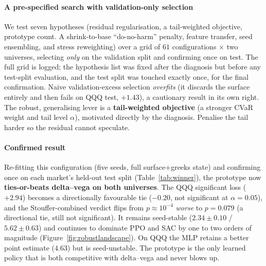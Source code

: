 \documentclass[sigconf,anonymous]{acmart}
\begin{document}
\paragraph{A pre-specified search with validation-only selection} We test seven
hypotheses (residual regularisation, a tail-weighted objective, prototype count.
A shrink-to-base ``do-no-harm'' penalty, feature transfer, seed ensembling, and
stress reweighting) over a grid of $61$ configurations $\times$ two universes,
selecting \emph{only} on the validation split and confirming once on test. The full
grid is logged; the hypothesis list was fixed after the diagnosis but before any
test-split evaluation, and the test split was touched exactly once, for the final
confirmation. Naive validation-excess selection \emph{overfits} (it discards the
surface entirely and then fails on QQQ test, $+1.43$), a cautionary result in its own
right. The robust, generalising lever is a \textbf{tail-weighted objective} (a stronger
CVaR weight and tail level $\alpha$), motivated directly by the diagnosis. Penalise the
tail harder so the residual cannot speculate.

\paragraph{Confirmed result} Re-fitting this configuration (five seeds, full
surface+greeks state) and confirming once on each market's held-out test split
(Table~\ref{tab:winner}), the prototype now \textbf{ties-or-beats delta--vega on both
universes}. The QQQ significant loss ($+2.94$) becomes a directionally favourable tie
($-0.20$, not significant at $\alpha=0.05$), and the Stouffer-combined verdict flips
from $p\approx10^{-4}$ \emph{worse} to $p=0.079$ (a directional tie, still not
significant). It remains seed-stable ($2.34\pm0.10$ / $5.62\pm0.63$) and continues
to dominate PPO and SAC by one to two orders of magnitude
(Figure~\ref{fig:robustlandscape}). On QQQ the MLP retains a better point estimate
($4.63$) but is seed-unstable. The prototype is the only learned policy that is both
competitive with delta--vega and never blows up.
\end{document}
